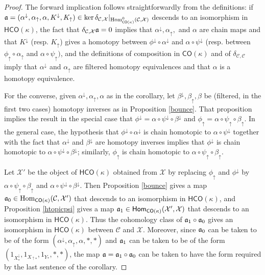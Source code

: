 \documentclass[11pt]{amsart}
\theoremstyle{definition}
\theoremstyle{remark}
\numberwithin{equation}{section}
\begin{document}
	\begin{proof}
		The forward implication follows straightforwardly from the definitions: if $\frak{a}=(\alpha^{\downarrow},\alpha_{\uparrow},\alpha,K^{\downarrow},K_{\uparrow})\in \ker\delta_{\mathcal{C},\mathcal{X}}|_{\mathrm{Hom}^{0}_{\mathsf{CO}(\kappa)}(\mathcal{C},\mathcal{X})}$ descends to an isomorphism in $\mathsf{HCO}(\kappa)$, the fact that $\delta_{\mathcal{C},\mathcal{X}}\frak{a}=0$ implies that $\alpha^{\downarrow},\alpha_{\uparrow},$ and $\alpha$ are chain maps and that $K^{\downarrow}$ (resp. $K_{\uparrow}$) gives a homotopy between $\phi^{\downarrow}\circ \alpha^{\downarrow}$ and $\alpha\circ \psi^{\downarrow}$ (resp. between $\phi_{\uparrow}\circ \alpha_{\uparrow}$ and $\alpha\circ \psi_{\uparrow})$, and the definitions of composition in $\mathsf{CO}(\kappa)$ and of $\delta_{\mathcal{C},\mathcal{C}}$ imply that $\alpha^{\downarrow}$ and $\alpha_{\uparrow}$ are filtered homotopy equivalences and that $\alpha$ is a homotopy equivalence.  
		
		For the converse, given $\alpha^{\downarrow},\alpha_{\uparrow},\alpha$ as in the corollary, let $\beta^{\downarrow},\beta_{\uparrow},\beta$ be (filtered, in the first two cases) homotopy inverses as in Proposition \ref{bounce}.  That proposition implies the result in the special case that $\phi^{\downarrow}=\alpha\circ \psi^{\downarrow}\circ \beta^{\downarrow}$ and $\phi_{\uparrow}=\alpha\circ \psi_{\uparrow}\circ \beta_{\uparrow}$.  In  the general case, the hypothesis that $\phi^{\downarrow}\circ \alpha^{\downarrow}$ is chain homotopic to $\alpha\circ \psi^{\downarrow}$ together with the fact that $\alpha^{\downarrow}$ and $\beta^{\downarrow}$ are homotopy inverses implies that $\phi^{\downarrow}$ is chain homotopic to $\alpha\circ \psi^{\downarrow}\circ \beta^{\downarrow}$; similarly, $\phi_{\uparrow}$ is chain homotopic to $\alpha\circ\psi_{\uparrow}\circ \beta_{\uparrow}$.  
		
		Let $\mathcal{X}'$ be the object of $\mathsf{HCO}(\kappa)$ obtained from $\mathcal{X}$ by replacing $\phi_{\uparrow}$ and $\phi^{\downarrow}$ by 	$\alpha\circ\psi_{\uparrow}\circ \beta_{\uparrow}$ and  $\alpha\circ \psi^{\downarrow}\circ \beta^{\downarrow}$.  Then Proposition \ref{bounce} gives a map $\frak{a}_0\in \mathrm{Hom}_{\mathsf{CO}(\kappa)}(\mathcal{C},\mathcal{X}')$ that descends to an isomorphism in $\mathsf{HCO}(\kappa)$, and Proposition \ref{htopicpsi} gives a map $\frak{a}_1\in\mathsf{Hom}_{\mathsf{CO}(\kappa)}(\mathcal{X}',\mathcal{X})$ that descends to an isomorphism in $\mathsf{HCO}(\kappa)$.  Thus the cohomology class of $\frak{a}_1\circ\frak{a}_0$ gives an isomorphism in $\mathsf{HCO}(\kappa)$ between $\mathcal{C}$ and $\mathcal{X}$.  Moreover, since $\frak{a}_0$ can be taken to be of the form $(\alpha^{\downarrow},\alpha_{\uparrow},\alpha,*,*)$ and $\frak{a}_1$ can be taken to be of the form $(1_{X^{\downarrow}_{*}},1_{X_{\uparrow*}},1_{Y_*},*,*)$, the map $\frak{a}=\frak{a}_1\circ\frak{a}_0$ can be taken to have the form required by the last sentence of the corollary.
			
	\end{proof}
	
\end{document}
